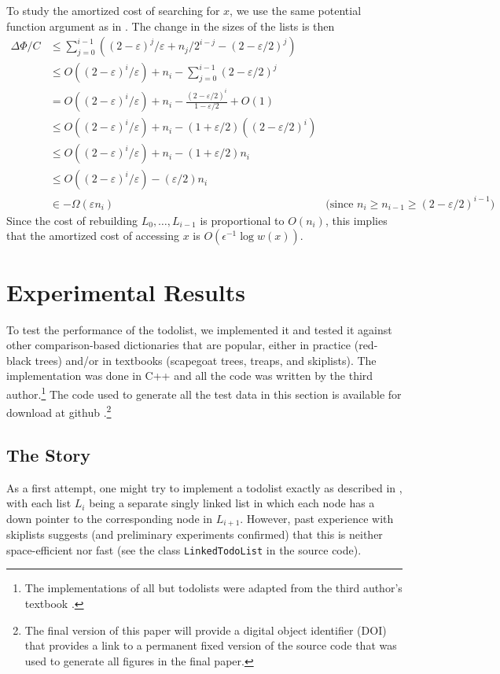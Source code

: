 \documentclass[lotsofwhite]{patmorin}
\newcommand{\eps}{\varepsilon}
\begin{document}
To study the amortized cost of searching for $x$, we use the same
potential function argument as in .  The change in the sizes of the lists is then 
\begin{align*}
  \Delta\Phi/C & \le \sum_{j=0}^{i-1}\left((2-\eps)^j/\eps + n_j/2^{i-j} - (2-\eps/2)^j\right) \\
  & \le O((2-\eps)^i/\eps) + n_i - \sum_{j=0}^{i-1}(2-\eps/2)^j \\
  & = O((2-\eps)^i/\eps) + n_i - \frac{(2-\eps/2)^i}{1-\eps/2} + O(1) \\
  & \le O((2-\eps)^i/\eps) + n_i - (1+\eps/2)((2-\eps/2)^i) \\
  & \le O((2-\eps)^i/\eps) + n_i - (1+\eps/2)n_i \\
  & \le O((2-\eps)^i/\eps) - (\eps/2)n_i \\
  & \in - \Omega(\eps n_i) & \text{(since $n_i \ge n_{i-1} \ge (2-\eps/2)^{i-1}$)}
\end{align*}
Since the cost of rebuilding $L_0,\ldots,L_{i-1}$ is proportional to $O(n_i)$, this implies that the amortized cost of accessing $x$ is $O(\epsilon^{-1}\log w(x))$.


\section{Experimental Results}

To test the performance of the todolist, we implemented it and tested
it against other comparison-based dictionaries that are popular, either
in practice (red-black trees) and/or in textbooks (scapegoat trees,
treaps, and skiplists).  The implementation was done in C++ and all
the code was written by the third author.\footnote{The implementations of all
but todolists were adapted from the third author's textbook \cite{S}.}
The code used to generate all the test data in this section is available
for download at github \cite{}.\footnote{The final version of this paper
will provide a digital object identifier (DOI) that provides a link to
a permanent fixed version of the source code that was used to generate
all figures in the final paper.}

\subsection{The Story}

As a first attempt, one might try to implement a todolist exactly
as described in , with each list $L_i$ being a
separate singly linked list in which each node has a down pointer to
the corresponding node in $L_{i+1}$.  However, past experience with
skiplists suggests (and preliminary experiments confirmed) that this is
neither space-efficient nor fast (see the class \texttt{LinkedTodoList}
in the source code).
\end{document}

